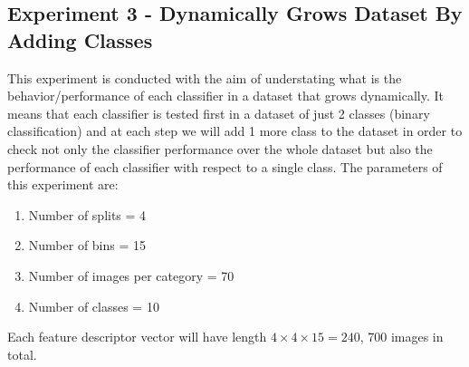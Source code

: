 \subsection{Experiment 3 - Dynamically Grows Dataset By Adding Classes}

This experiment is conducted with the aim of understating what is the behavior/performance of each classifier in a dataset that grows dynamically. It means that each classifier is tested first in a dataset of just 2 classes (binary classification) and at each step we will add 1 more class to the dataset in order to check not only the classifier performance over the whole dataset but also the performance of each classifier  with respect to a single class. 
The parameters of this experiment are:
\begin{enumerate}
    \item Number of splits = 4
    \item Number of bins = 15
    \item Number of images per category = 70
    \item Number of classes = 10
\end{enumerate}
Each feature descriptor vector will have length $4\times4\times15 = 240$, 700 images in total.\\

